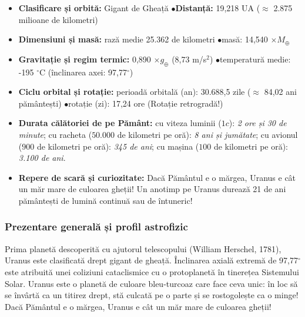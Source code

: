 \begin{tcolorbox}[orbitardata, title={\textbf{Repere esențiale: Uranus}}]
\small
\begin{itemize}[leftmargin=1.4em, itemsep=2pt, topsep=2pt]
  \item \textbf{Clasificare și orbită:} Gigant de Gheață \quad$\bullet$\quad \textbf{Distanță:} 19,218 UA ($\approx$ 2.875 milioane de kilometri)
  \item \textbf{Dimensiuni și masă:} rază medie 25.362 de kilometri \quad$\bullet$\quad masă: 14,540 $\times M_\oplus$
  \item \textbf{Gravitație și regim termic:} 0,890 $\times g_\oplus$ (8,73 m/s$^2$) \quad$\bullet$\quad temperatură medie: -195 $^\circ$C (înclinarea axei: 97,77$^\circ$)
  \item \textbf{Ciclu orbital și rotație:} perioadă orbitală (an): 30.688,5 zile ($\approx$ 84,02 ani pământești) \quad$\bullet$\quad rotație (zi): 17,24 ore (Rotație retrogradă!)
  \item \textbf{Durata călătoriei de pe Pământ:} cu viteza luminii ($1c$): \emph{2 ore și 30 de minute}; cu racheta ($50.000$ de kilometri pe oră): \emph{8 ani și jumătate}; cu avionul ($900$ de kilometri pe oră): \emph{345 de ani}; cu mașina ($100$ de kilometri pe oră): \emph{3.100 de ani}.
  \item \textbf{Repere de scară și curiozitate:} Dacă Pământul e o mărgea, Uranus e cât un măr mare de culoarea gheții! Un anotimp pe Uranus durează 21 de ani pământești de lumină continuă sau de întuneric!
\end{itemize}
\end{tcolorbox}

\subsubsection*{Prezentare generală și profil astrofizic}
Prima planetă descoperită cu ajutorul telescopului (William Herschel, 1781), Uranus este clasificată drept \guillemotleft{}gigant de gheață\guillemotright{}. Înclinarea axială extremă de 97,77$^\circ$ este atribuită unei coliziuni cataclismice cu o protoplanetă în tinerețea Sistemului Solar. Uranus este o planetă de culoare bleu-turcoaz care face ceva unic: în loc să se învârtă ca un titirez drept, stă culcată pe o parte și se rostogolește ca o minge! Dacă Pământul e o mărgea, Uranus e cât un măr mare de culoarea gheții!

